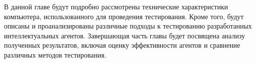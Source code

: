 В данной главе будут подробно рассмотрены технические характеристики компьютера, использованного для проведения тестирования. Кроме того, будут описаны и проанализированы различные подходы к тестированию разработанных интеллектуальных агентов. Завершающая часть главы будет посвящена анализу полученных результатов, включая оценку эффективности агентов и сравнение различных методов тестирования.
